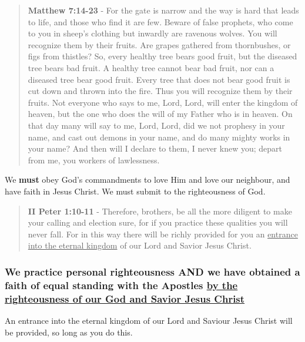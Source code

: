 \documentclass[11pt]{article}
\begin{document}
\begin{quote}
\textbf{Matthew 7:14-23} - For the gate is narrow and the way is hard that leads to life, and those who find it are few.  Beware of false prophets, who come to you in sheep's clothing but inwardly are ravenous wolves.  You will recognize them by their fruits. Are grapes gathered from thornbushes, or figs from thistles?  So, every healthy tree bears good fruit, but the diseased tree bears bad fruit.  A healthy tree cannot bear bad fruit, nor can a diseased tree bear good fruit.  Every tree that does not bear good fruit is cut down and thrown into the fire.  Thus you will recognize them by their fruits.  Not everyone who says to me, Lord, Lord, will enter the kingdom of heaven, but the one who does the will of my Father who is in heaven.  On that day many will say to me, Lord, Lord, did we not prophesy in your name, and cast out demons in your name, and do many mighty works in your name?  And then will I declare to them, I never knew you; depart from me, you workers of lawlessness.
\end{quote}

We \textbf{must} obey God's commandments to love Him and love our neighbour, and have faith in Jesus Christ.
We must submit to the righteousness of God.

\begin{quote}
\textbf{II Peter 1:10-11} - Therefore, brothers, be all the more diligent to make your calling and election sure, for if you practice these qualities you will never fall. For in this way there will be richly provided for you an \uline{entrance into the eternal kingdom} of our Lord and Savior Jesus Christ.
\end{quote}

\subsubsection{We practice personal righteousness AND we have obtained a faith of equal standing with the Apostles \underline{by the righteousness of our God and Savior Jesus Christ}}
\label{sec:org5b84102}
An entrance into the eternal kingdom of our Lord and Saviour Jesus Christ will
be provided, so long as you do this.
\end{document}
